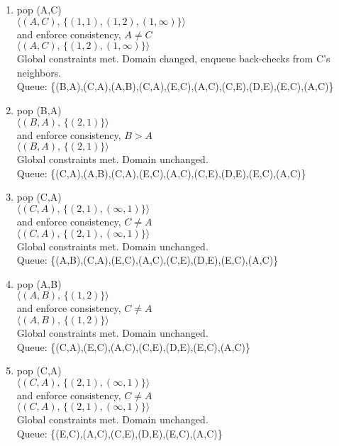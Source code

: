 \documentclass[fleqn]{hermans-hw}
\begin{document}
\begin{enumerate}
\begin{enumerate}
	\item pop (A,C)\\
	$\langle(A,C), \, \lbrace (1,1),(1,2),(1,\infty) \rbrace \rangle$\\
	and enforce consistency, $ A \neq C $ \\
	$\langle(A,C), \, \lbrace (1,2),(1,\infty) \rbrace \rangle$\\
	Global constraints met. Domain changed, enqueue back-checks from C's neighbors.\\
	Queue: \{(B,A),(C,A),(A,B),(C,A),(E,C),(A,C),(C,E),(D,E),(E,C),(A,C)\}\\

	\item pop (B,A)\\
	$\langle(B,A), \, \lbrace (2,1) \rbrace \rangle$\\
	and enforce consistency, $ B > A $ \\
	$\langle(B,A), \, \lbrace (2,1) \rbrace \rangle$\\
	Global constraints met. Domain unchanged.\\
	Queue: \{(C,A),(A,B),(C,A),(E,C),(A,C),(C,E),(D,E),(E,C),(A,C)\}\\
	
	\item pop (C,A)\\
	$\langle(C,A), \, \lbrace (2,1),(\infty,1) \rbrace \rangle$\\
	and enforce consistency, $ C \neq A $ \\
	$\langle(C,A), \, \lbrace (2,1),(\infty,1) \rbrace \rangle$\\
	Global constraints met. Domain unchanged.\\
	Queue: \{(A,B),(C,A),(E,C),(A,C),(C,E),(D,E),(E,C),(A,C)\}\\

	\item pop (A,B)\\
	$\langle(A,B), \, \lbrace (1,2) \rbrace \rangle$\\
	and enforce consistency, $ C \neq A $ \\
	$\langle(A,B), \, \lbrace (1,2) \rbrace \rangle$\\
	Global constraints met. Domain unchanged.\\
	Queue: \{(C,A),(E,C),(A,C),(C,E),(D,E),(E,C),(A,C)\}\\
	
	\item pop (C,A)\\
	$\langle(C,A), \, \lbrace (2,1),(\infty,1) \rbrace \rangle$\\
	and enforce consistency, $ C \neq A $ \\
	$\langle(C,A), \, \lbrace (2,1),(\infty,1) \rbrace \rangle$\\
	Global constraints met. Domain unchanged.\\
	Queue: \{(E,C),(A,C),(C,E),(D,E),(E,C),(A,C)\}\\
	

\end{enumerate}
\end{enumerate}
\end{document}
